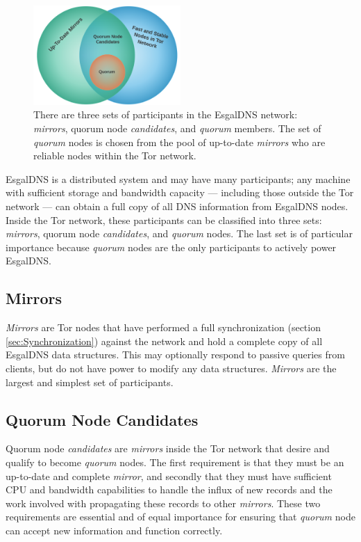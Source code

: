 \begin{figure}[htbp]
	\centering
	\includegraphics[width=0.5\textwidth]{images/LucidCharts/Participants.png}
	\caption{There are three sets of participants in the EsgalDNS network: \emph{mirrors}, quorum node \emph{candidates}, and \emph{quorum} members. The set of \emph{quorum} nodes is chosen from the pool of up-to-date \emph{mirrors} who are reliable nodes within the Tor network.}
\end{figure}

EsgalDNS is a distributed system and may have many participants; any machine with sufficient storage and bandwidth capacity --- including those outside the Tor network --- can obtain a full copy of all DNS information from EsgalDNS nodes. Inside the Tor network, these participants can be classified into three sets: \emph{mirrors}, quorum node \emph{candidates}, and \emph{quorum} nodes. The last set is of particular importance because \emph{quorum} nodes are the only participants to actively power EsgalDNS.

\subsection{Mirrors}

\emph{Mirrors} are Tor nodes that have performed a full synchronization (section \ref{sec:Synchronization}) against the network and hold a complete copy of all EsgalDNS data structures. This may optionally respond to passive queries from clients, but do not have power to modify any data structures. \emph{Mirrors} are the largest and simplest set of participants.

\subsection{Quorum Node Candidates}

Quorum node \emph{candidates} are \emph{mirrors} inside the Tor network that desire and qualify to become \emph{quorum} nodes. The first requirement is that they must be an up-to-date and complete \emph{mirror}, and secondly that they must have sufficient CPU and bandwidth capabilities to handle the influx of new records and the work involved with propagating these records to other \emph{mirrors}. These two requirements are essential and of equal importance for ensuring that \emph{quorum} node can accept new information and function correctly.

